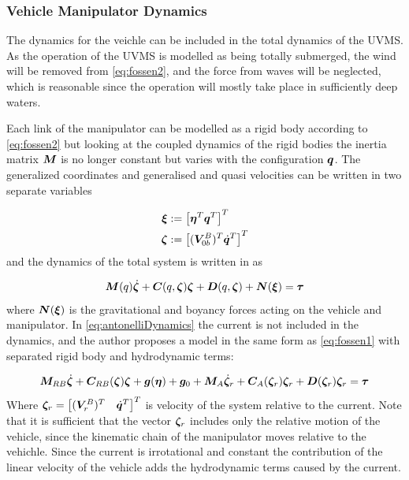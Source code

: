 \subsubsection{Vehicle Manipulator Dynamics}
The dynamics for the veichle can be included in the total dynamics of the UVMS. As the operation of the UVMS is modelled as being totally submerged, the wind will be removed from \eqref{eq:fossen2}, and the force from waves will be neglected, which is reasonable since the operation will mostly take place in sufficiently deep waters.

Each link of the manipulator can be modelled as a rigid body according to \eqref{eq:fossen2} but looking at the coupled dynamics of the rigid bodies the inertia matrix $\boldsymbol M$ is no longer constant but varies with the configuration $\boldsymbol q$. The generalized coordinates and generalised and quasi velocities can be written in two separate variables

\begin{align}
  \boldsymbol \xi  & := \left[ \boldsymbol \eta^T \boldsymbol q^T \right]^T
  \label{eq:xi} \\
  \boldsymbol \zeta & := \left[ (\boldsymbol V_{0b}^B)^T \dot{\boldsymbol q}^T \right]^T
  \label{eq:zeta}
\end{align}
and the dynamics of the total system is written in \cite{antonelli1} as

\begin{align}
  \boldsymbol M(q)\dot{\boldsymbol \zeta} + \boldsymbol C(q,\boldsymbol \zeta) \boldsymbol \zeta +\boldsymbol D(q,\boldsymbol \zeta) + \boldsymbol N(\boldsymbol \xi)=\boldsymbol \tau
  \label{eq:antonelliDynamics}
\end{align}
where $\boldsymbol N(\boldsymbol \xi)$ is the gravitational and boyancy forces acting on the vehicle and manipulator. In \eqref{eq:antonelliDynamics} the current is not included in the dynamics, and the author proposes a model in the same form as \eqref{eq:fossen1} with separated rigid body and hydrodynamic terms:

\begin{align}
  \boldsymbol M_{RB}\dot{\boldsymbol \zeta}+ \boldsymbol C_{RB}(\boldsymbol \zeta)\boldsymbol \zeta + \boldsymbol g(\boldsymbol \eta) + \boldsymbol g_0 + \boldsymbol M_A \dot{\boldsymbol \zeta}_r  + \boldsymbol C_A(\boldsymbol \zeta_r) \boldsymbol \zeta_r + \boldsymbol D(\boldsymbol \zeta_r) \boldsymbol \zeta_r = \boldsymbol \tau 
  \label{eq:withinteraction}
\end{align}
Where $\boldsymbol \zeta_r = \begin{bmatrix} (\boldsymbol V_r^B)^T & \dot{\boldsymbol q}^T  \end{bmatrix}^T$ is velocity of the system relative to the current. Note that it is sufficient that the vector $\boldsymbol \zeta_r$ includes only the relative motion of the vehicle, since the kinematic chain of the manipulator moves relative to the vehichle. Since the current is irrotational and constant the contribution of the linear velocity of the vehicle adds the hydrodynamic terms caused by the current. 

